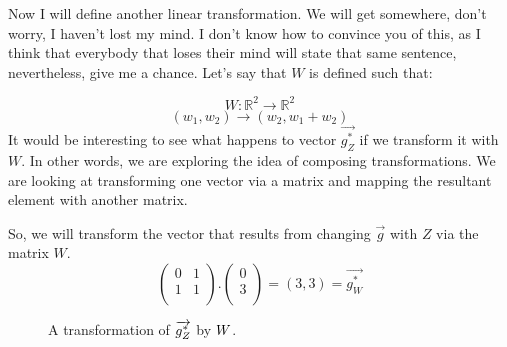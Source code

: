 \documentclass[600paper, 11pt,twoside,openany]{kdp}
\begin{document}
\indent Now I will define another linear transformation. We will get somewhere, don’t worry, I haven’t lost my mind. I don’t know how to convince you of this, as I think that everybody that loses their mind will state that same sentence, nevertheless, give me a chance. Let’s say that $W$ is defined such that:

\[W:\mathbb{R}^2 \rightarrow \mathbb{R}^2\]
\[(w_1,w_2) \rightarrow (w_2, w_1 + w_2) \]
\indent It would be interesting to see what happens to vector $\overrightarrow{g_Z^*}$ if we transform it with $W$. In other words, we are exploring the idea of composing transformations. We are looking at transforming one vector  via a matrix and mapping the resultant element with another matrix. 

So, we will transform the vector that results from changing  $\overrightarrow{g}$ with $Z$ via the matrix $W$.
\[\begin{pmatrix}
0 & 1   \\
1 & 1 \\
\end{pmatrix}.\begin{pmatrix}
0   \\
3  \\
\end{pmatrix} = (3,3) = \overrightarrow{g_W^*}
\]
\begin{figure}[h!]
\begin{center}
\end{center}
\caption{A transformation of $\protect\overrightarrow{g_Z^*}$  by $\protect W$.}
\end{figure}
\end{document}
